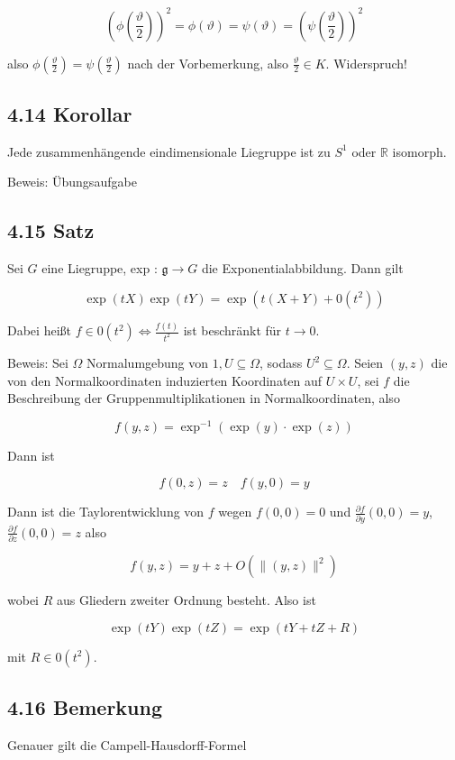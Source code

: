 \documentclass[10pt, letterpaper]{article}
\begin{document}
$$
\left(\phi\left(\frac{\vartheta}{2}\right)\right)^{2}=\phi(\vartheta)=\psi(\vartheta)=\left(\psi\left(\frac{\vartheta}{2}\right)\right)^{2}
$$

also $\phi\left(\frac{\vartheta}{2}\right)=\psi\left(\frac{\vartheta}{2}\right)$ nach der Vorbemerkung, also $\frac{\vartheta}{2} \in K$. Widerspruch!

\subsection*{4.14 Korollar}
Jede zusammenhängende eindimensionale Liegruppe ist zu $S^{1}$ oder $\mathbb{R}$ isomorph.

Beweis: Übungsaufgabe

\subsection*{4.15 Satz}
Sei $G$ eine Liegruppe, exp : $\mathfrak{g} \rightarrow G$ die Exponentialabbildung. Dann gilt

$$
\exp (t X) \exp (t Y)=\exp \left(t(X+Y)+0\left(t^{2}\right)\right)
$$

Dabei heißt $f \in 0\left(t^{2}\right) \Leftrightarrow \frac{f(t)}{t^{2}}$ ist beschränkt für $t \rightarrow 0$.

Beweis: Sei $\Omega$ Normalumgebung von $1, U \subseteq \Omega$, sodass $U^{2} \subseteq \Omega$. Seien $(y, z)$ die von den Normalkoordinaten induzierten Koordinaten auf $U \times U$, sei $f$ die Beschreibung der Gruppenmultiplikationen in Normalkoordinaten, also

$$
f(y, z)=\exp ^{-1}(\exp (y) \cdot \exp (z))
$$

Dann ist

$$
f(0, z)=z \quad f(y, 0)=y
$$

Dann ist die Taylorentwicklung von $f$ wegen $f(0,0)=0$ und $\frac{\partial f}{\partial y}(0,0)=y$, $\frac{\partial f}{\partial z}(0,0)=z$ also

$$
f(y, z)=y+z+O\left(\|(y, z)\|^{2}\right)
$$

wobei $R$ aus Gliedern zweiter Ordnung besteht. Also ist

$$
\exp (t Y) \exp (t Z)=\exp (t Y+t Z+R)
$$

mit $R \in 0\left(t^{2}\right)$.

\subsection*{4.16 Bemerkung}
Genauer gilt die Campell-Hausdorff-Formel
\end{document}
